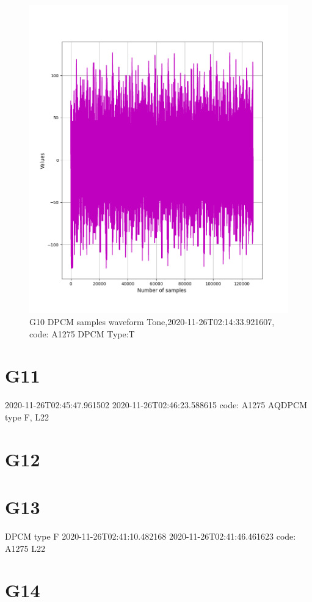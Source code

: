 \documentclass[hidelinks, 12pt, a4paper]{article}
\begin{document}
\begin{figure}[h!]
\centering
	\includegraphics[height=.4\textheight, width=\textwidth]{assets/session1/g10.png}
    \caption{G10 DPCM samples waveform Tone,2020-11-26T02:14:33.921607, code: A1275 DPCM Type:T}
\end{figure}

\section{G11}
2020-11-26T02:45:47.961502
2020-11-26T02:46:23.588615
code: A1275 AQDPCM type F, L22
\section{G12}


\section{G13}
DPCM type F
2020-11-26T02:41:10.482168
2020-11-26T02:41:46.461623
code: A1275 L22 

\section{G14}
\end{document}
